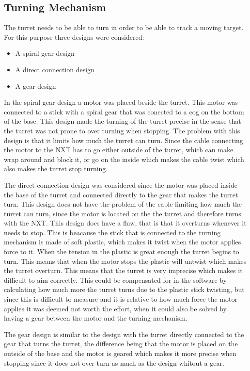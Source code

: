\subsection{Turning Mechanism}
The turret needs to be able to turn in order to be able to track a moving
target. For this purpose three designs were considered: 

\begin{itemize}
  \item A spiral gear design
  \item A direct connection design
  \item A gear design
\end{itemize}

In the spiral gear design a motor was placed beside the turret. This motor was
connected to a stick with a spiral gear that was conected to a cog on the bottom
of the base. This design made the turning of the turret precise in the sense
that the turret was not prone to over turning when stopping. The
problem with this design is that it limits how much the turret can turn.
Since the cable connecting the motor to the NXT has to go either
outside of the turret, which can make wrap around and block it, or go on the
inside which makes the cable twist which also makes the turret stop turning.\nl

The direct connection design was considered since the motor was placed inside
the base of the turret and connected directly to the gear that makes the turret turn. This
design does not have the problem of the cable limiting how much the turret can
turn, since the motor is located on the the turret and therefore turns with the
NXT. This design does have a flaw, that is that it overturns whenever it needs
to stop. This is beacause the stick that is connected to the turning mechanism
is made of soft plastic, which makes it twist when the motor applies force to
it. When the tension in the plastic is great enough the turret begins to turn.
This means that when the motor stops the plastic will untwist which makes the
turret overturn. This means that the turret is very imprecise which makes it
difficult to aim correctly. This could be compensated for in the software by
calculating how much more the turret turns due to the plastic stick twisting,
but since this is difficult to measure and it is relative to how much force the motor applies it was deemed
not worth the effort, when it could also be solved by having a gear between
the motor and the turning mechanism.\nl

The gear design is similar to the design with the turret directly connected to
the gear that turns the turret, the difference being that the motor is placed on
the outside of the base and the motor is geared which makes it more precise when
stopping since it does not over turn as much as the design whitout a gear. 


